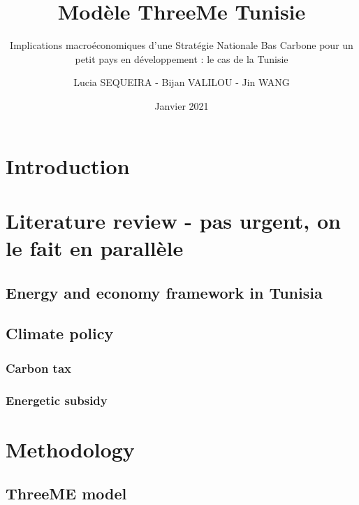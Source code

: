 \documentclass[
]{article}
\title{Modèle ThreeMe Tunisie}
\subtitle{Implications macroéconomiques d'une Stratégie Nationale Bas
Carbone pour un petit pays en développement : le cas de la Tunisie}
\author{Lucia SEQUEIRA - Bijan VALILOU - Jin WANG}
\date{Janvier 2021}
\begin{document}
\maketitle

{
\setcounter{tocdepth}{2}
\tableofcontents
}
\newpage

\hypertarget{introduction}{%
\section{Introduction}\label{introduction}}

\hypertarget{literature-review---pas-urgent-on-le-fait-en-paralluxe8le}{%
\section{Literature review - pas urgent, on le fait en
parallèle}\label{literature-review---pas-urgent-on-le-fait-en-paralluxe8le}}

\hypertarget{energy-and-economy-framework-in-tunisia}{%
\subsection{Energy and economy framework in
Tunisia}\label{energy-and-economy-framework-in-tunisia}}

\hypertarget{climate-policy}{%
\subsection{Climate policy}\label{climate-policy}}

\hypertarget{carbon-tax}{%
\subsubsection{Carbon tax}\label{carbon-tax}}

\hypertarget{energetic-subsidy}{%
\subsubsection{Energetic subsidy}\label{energetic-subsidy}}

\hypertarget{methodology}{%
\section{Methodology}\label{methodology}}

\hypertarget{threeme-model}{%
\subsection{ThreeME model}\label{threeme-model}}
\end{document}
